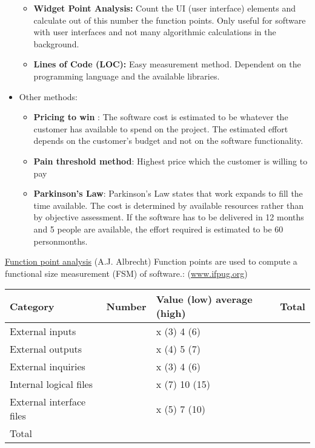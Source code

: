 \begin{itemize}
\begin{itemize}
\item {\bfseries Widget Point Analysis:}
  Count the UI (user interface) elements and calculate out of this
  number the function points. Only useful for software with user interfaces and
  not many algorithmic calculations in the background.
\item {\bfseries Lines of Code (LOC):}
  Easy measurement method. Dependent on the programming language and the
  available libraries.
\end{itemize}
\ifslides
\newpage
\fi
\item Other methods:
  \begin{itemize}
  \item {\bfseries Pricing to win }:
  The software cost is estimated to be whatever the customer has
  available to spend on the project. The estimated effort depends on the
  customer's budget and not on the software functionality.
  \item {\bfseries Pain threshold method}:
  Highest price which the customer is willing to pay
\item {\bfseries Parkinson's Law}:
Parkinson's Law states that work expands to fill the time available. The
cost is determined by available resources rather than by objective
assessment. If the software has to be delivered in 12 months and 5
people are available, the effort required is estimated to be 60 personmonths.
  \end{itemize}
\end{itemize}
\ifslides
\newpage
\fi
\underline{Function point analysis} (A.J. Albrecht)
Function points are used to compute a functional size measurement
(FSM) of software.: (\href{http://www.ifpug.org}{www.ifpug.org})
\begin{center}
\begin{tabular}{|l|l|l|l|}
\hline
Category & Number & Value (low) average (high) & Total \\
\hline
External inputs & &  x (3) 4 (6) & \\
External outputs & & x (4) 5 (7) & \\
External inquiries & & x (3) 4 (6) & \\
Internal logical files & & x (7) 10 (15) & \\
External interface files & & x (5) 7 (10) & \\
\hline
\multicolumn{3}{|l|}{Total}  &\\
\hline
\end{tabular}
\end{center}
